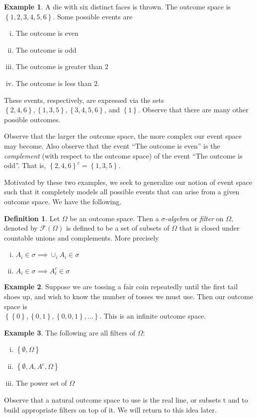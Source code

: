 \documentclass[12pt]{amsbook}
\newcommand{\filter}{\mathcal{F}}
\theoremstyle{plain}
\theoremstyle{definition}
\newtheorem*{definition}{Definition}
\newtheorem*{example}{Example}
\theoremstyle{remark}
\numberwithin{equation}{section}  %
\begin{document}
\begin{example}
	A die with six distinct faces is thrown. The outcome space is
	$ \left\{ 1, 2, 3, 4, 5, 6 \right\} $. Some possible events are
	\begin{enumerate}[(i)]
		\item The outcome is even
		\item The outcome is odd
		\item The outcome is greater than $2$
		\item The outcome is less than $2$.
	\end{enumerate}
	These events, respectively, are expressed via the sets
	$ \left\{ 2, 4, 6 \right\} , \left\{ 1,3,5 \right\} , \left\{ 3, 4, 5, 6
	\right\}$, and $\left\{ 1 \right\}$.
	Observe that there are many other possible outcomes.
\end{example}
Observe that the larger the outcome space, the more complex
our event space may become. Also observe that the event
``The outcome is even'' is the \emph{complement} (with respect to the
outcome space) of
the event ``The outcome is odd''. That is,
${\left\{ 2,4,6 \right\}}^c
= \left\{ 1,3,5 \right\}$.

Motivated by these two examples, we seek to generalize our notion of
event space such that it completely models all possible events
that can arise from a given outcome space. We have the following.
\begin{definition}
	Let $\Omega$ be an outcome space. Then a \emph{$\sigma$-algebra}
	or \emph{filter} on $\Omega$, denoted by $\filter(\Omega)$ is defined to be 
	a
	set of subsets of $\Omega$ that is closed under countable
	unions and complements.
	More precisely
	\begin{enumerate}[(i)]
		\item $ A_i \in  \sigma \implies \cup_i A_i \in \sigma$
		\item $A_i \in \sigma \implies A_i^c \in \sigma$
	\end{enumerate}
\end{definition}
\begin{example}
	Suppose we are tossing a fair coin repeatedly until the first tail shoes up,
	and wish to know the number of tosses we must use. Then our outcome space
	is \\ $ \left\{ \left\{ 0 \right\} , \left\{ 0,1 \right\} , \left\{ 0,0,1
	\right\},\ldots \right\}$. This is an infinite outcome space.
\end{example}
\begin{example} The following are all filters of $\Omega$:
	\begin{enumerate}[(i)]
		\item $\left\{ \emptyset, \Omega \right\}$
		\item $\left\{ \emptyset, A, A^c, \Omega \right\}$
		\item The power set of $\Omega$
	\end{enumerate}
\end{example}Observe that a natural outcome space to use is the real line, or subsets
t and to build appropriate filters on top of it. We will return
to this idea later.
\end{document}
